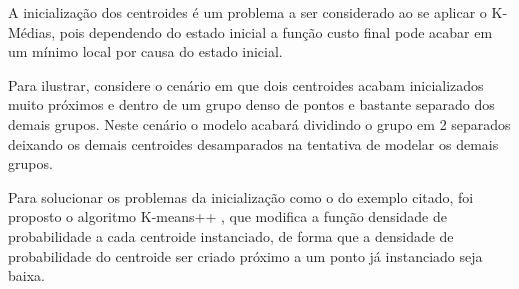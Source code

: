 A inicialização dos centroides é um problema a ser considerado ao se aplicar o K-Médias, pois dependendo do estado inicial a função custo final pode acabar em um mínimo local por causa do estado inicial.

Para ilustrar, considere o cenário em que dois centroides acabam inicializados muito próximos e dentro de um grupo denso de pontos e bastante separado dos demais grupos. Neste cenário o modelo acabará dividindo o grupo em 2 separados deixando os demais centroides desamparados na tentativa de modelar os demais grupos.

Para solucionar os problemas da inicialização como o do exemplo citado, foi proposto o algoritmo K-means++ \citep{arthur2007k}, que modifica a função densidade de probabilidade a cada centroide instanciado, de forma que a densidade de probabilidade do centroide ser criado próximo a um ponto já instanciado seja baixa.
